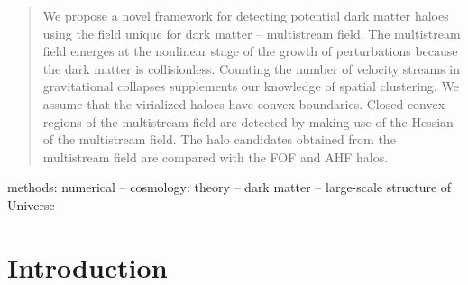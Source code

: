 \documentclass[fleqn,usenatbib,useAMS]{mnras}
\begin{document}
\begin{abstract}
We propose a novel framework for detecting potential dark matter haloes using the field unique for dark matter  -- multistream field. The multistream field  emerges at the nonlinear stage of the growth of perturbations because the dark matter is collisionless. Counting the number of velocity streams in gravitational collapses supplements our knowledge of spatial clustering. 
We assume that the virialized haloes have convex boundaries. Closed convex regions of the multistream field are detected by making use of the Hessian of the multistream field. The halo candidates obtained from the multistream field are compared with the FOF and AHF halos.



\end{abstract}

\begin{keywords}
methods: numerical -- cosmology: theory -- dark matter -- large-scale structure of Universe 
\end{keywords}

\begingroup
\let\clearpage\relax
\endgroup
\newpage

\section{Introduction} 
\label{sec:intro}
\end{document}
